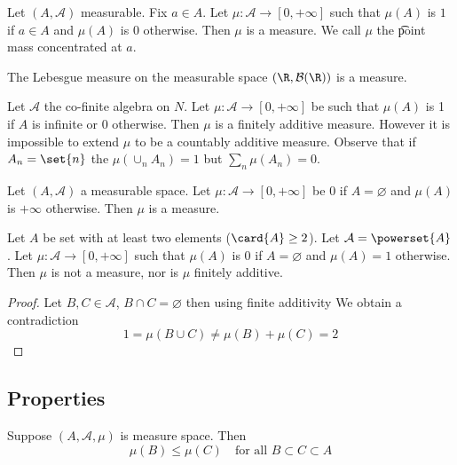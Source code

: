 \begin{example}
Let $(A, \mathcal{A} )$ measurable.
Fix $a \in A$.
Let $\mu : \mathcal{A}  \to [0, +\infty]$ such that $\mu (A)$ is $1$ if $a \in A$ and $\mu (A)$ is $0$ otherwise.
Then $\mu $ is a measure.
We call $\mu $ the \t{point mass} concentrated at $a$.
\end{example}

\begin{example}
The Lebesgue measure on the measurable space $(\R , \mathcal{B} (\R ))$ is a measure.
\end{example}

\begin{example}
Let $\mathcal{A} $ the co-finite algebra on $N$.
Let $\mu : \mathcal{A}  \to [0, +\infty]$ be such that $\mu (A)$ is 1 if $A$ is infinite or 0 otherwise.
Then $\mu $ is a finitely additive measure.
However it is impossible to extend $\mu $ to be a countably additive measure.
Observe that if $A_n = \set{n}$ the $\mu (\cup_{n} A_n) = 1$ but $\sum_{n} \mu (A_n) = 0$.
\end{example}

\begin{example}
Let $(A, \mathcal{A} )$ a measurable space.
Let $\mu : \mathcal{A}  \to [0, +\infty]$ be $0$ if $A = \varnothing$ and $\mu (A)$ is $+\infty$ otherwise.
Then $\mu $ is a measure.

\end{example}

\begin{example}
Let $A$ be set with at least two elements ($\card{A} \geq 2$).
Let $\mathcal{A}  = \powerset{A}$.
Let $\mu : \mathcal{A}  \to [0, +\infty]$ such that $\mu (A)$ is $0$ if $A = \varnothing$ and $\mu (A) = 1$ otherwise.
Then $\mu $ is not a measure, nor is $\mu $ finitely additive.
\begin{proof}Let $B, C \in \mathcal{A} $,
$B \cap  C = \varnothing$
then using finite additivity
We obtain a contradiction
\[
1 = \mu (B \cup C) \neq \mu (B) + \mu (C) = 2
\]\end{proof}
\end{example}

\subsection*{Properties}

\begin{proposition}[monotonicity]
Suppose $(A, \mathcal{A} , \mu )$ is measure space.
Then
\[
\mu (B) \leq \mu (C) \quad \text{for all } B \subset C \subset A
\]
\end{proposition}

